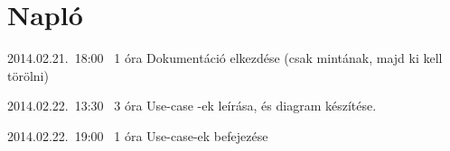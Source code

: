 %
\section{Napló}

\begin{naplo}

\bejegyzes
{2014.02.21.~18:00~} %
{1 óra} %
{\antal} %
{Dokumentáció elkezdése (csak mintának, majd ki kell törölni)} %

\bejegyzes
{2014.02.22.~13:30~}
{3 óra}
{\adam}
{Use-case -ek leírása, és diagram készítése.}

\bejegyzes
{2014.02.22.~19:00~}
{1 óra}
{\adam}
{Use-case-ek befejezése}

\end{naplo}

